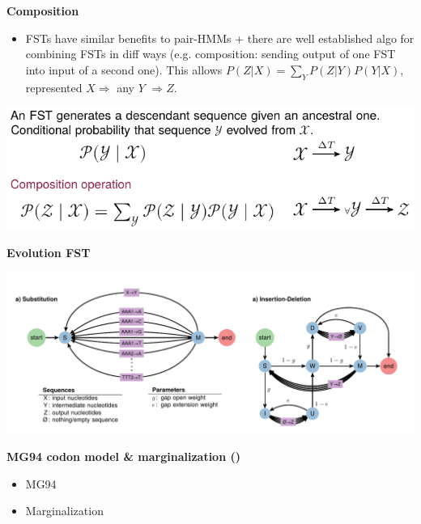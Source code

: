 \textbf{Composition}
    \begin{itemize}
    \item FSTs have similar benefits to pair-HMMs + there are
        well established algo for combining FSTs in diff ways
        (e.g. composition: sending output of one FST into input
        of a second one). This allows $P(Z|X) = \sum_Y P(Z|Y) P(Y|X)$,
        represented $X \Rightarrow$ any $Y$ $\Rightarrow Z$.
    \end{itemize}
    \begin{center}
    \includegraphics[scale=1]{figures/fig-fst.pdf}
    \end{center}

\textbf{Evolution FST}
    \begin{center}
        \hspace*{-2cm}\includegraphics[width=\textwidth]{figures/fig-evolution-fst.pdf}
    \end{center}


\textbf{MG94 codon model \& marginalization ()}
    \begin{itemize}
    \item MG94
    \item Marginalization
    \end{itemize}


